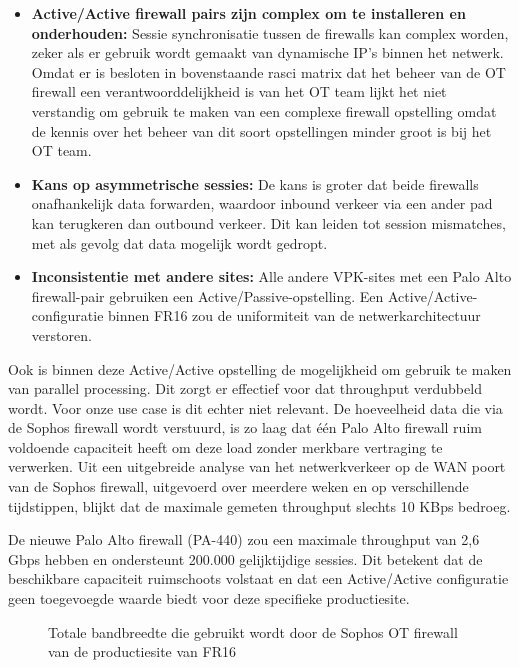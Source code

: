 \begin{itemize}
    \item \textbf{Active/Active firewall pairs zijn complex om te installeren en onderhouden:}  Sessie synchronisatie tussen de firewalls kan complex worden, zeker als er gebruik wordt gemaakt van dynamische IP’s binnen het netwerk. Omdat er is besloten in bovenstaande rasci matrix dat het beheer van de OT firewall een verantwoorddelijkheid is van het OT team lijkt het niet verstandig om gebruik te maken van een complexe firewall opstelling omdat de kennis over het beheer van dit soort opstellingen minder groot is bij het OT team. 
    
    \item \textbf{Kans op asymmetrische sessies:} De kans is groter dat beide firewalls onafhankelijk data forwarden, waardoor inbound verkeer via een ander pad kan terugkeren dan outbound verkeer. Dit kan leiden tot session mismatches, met als gevolg dat data mogelijk wordt gedropt.
    
    \item \textbf{Inconsistentie met andere sites:}  Alle andere VPK-sites met een Palo Alto firewall-pair gebruiken een Active/Passive-opstelling. Een Active/Active-configuratie binnen FR16 zou de uniformiteit van de netwerkarchitectuur verstoren.
    
\end{itemize}

Ook is binnen deze Active/Active opstelling de mogelijkheid om gebruik te maken van parallel processing. Dit zorgt er effectief voor dat throughput verdubbeld wordt. \autocite{Fulp2006} Voor onze use case is dit echter niet relevant. De hoeveelheid data die via de Sophos firewall wordt verstuurd, is zo laag dat één Palo Alto firewall ruim voldoende capaciteit heeft om deze load zonder merkbare vertraging te verwerken. Uit een uitgebreide analyse van het netwerkverkeer op de WAN poort van de Sophos firewall, uitgevoerd over meerdere weken en op verschillende tijdstippen, blijkt dat de maximale gemeten throughput slechts 10 KBps bedroeg.

\vspace{5mm}
De nieuwe Palo Alto firewall (PA-440) zou een maximale throughput van 2,6 Gbps hebben en ondersteunt 200.000 gelijktijdige sessies. \autocite{PaloAltoDS2025} Dit betekent dat de beschikbare capaciteit ruimschoots volstaat en dat een Active/Active configuratie geen toegevoegde waarde biedt voor deze specifieke productiesite.

\begin{figure}[H]
    \centering
    \caption[Sophos firewall bandwidth graph]{\label{fig:grail}Totale bandbreedte die gebruikt wordt door de Sophos OT firewall van de productiesite van FR16}
\end{figure}




